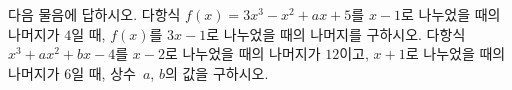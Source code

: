 다음 물음에 답하시오.
 다항식 $f(x)=3x^3-x^2+ax+5$를 $x-1$로 나누었을 때의 나머지가 $4$일 때, $f(x)$를 $3x-1$로 나누었을 때의 나머지를 구하시오. 
 다항식 $x^3+ax^2+bx-4$를 $x-2$로 나누었을 때의 나머지가 $12$이고, $x+1$로 나누었을 때의 나머지가 $6$일 때, 상수~$a$, $b$의 값을 구하시오.
